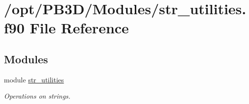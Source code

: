 \hypertarget{str__utilities_8f90}{}\section{/opt/\+P\+B3\+D/\+Modules/str\+\_\+utilities.f90 File Reference}
\label{str__utilities_8f90}
\subsection*{Modules}
\begin{DoxyCompactItemize}
\item 
module \hyperlink{namespacestr__utilities}{str\+\_\+utilities}
\begin{DoxyCompactList}\small\item\em Operations on strings. \end{DoxyCompactList}\end{DoxyCompactItemize}
